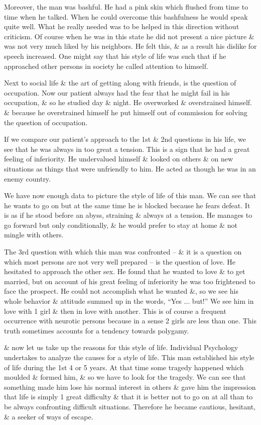 \documentclass{article}
\numberwithin{equation}{section}
\begin{document}
Moreover, the man was bashful. He had a pink skin which flushed from time to time when he talked. When he could overcome this bashfulness he would speak quite well. What he really needed was to be helped in this direction without criticism. Of course when he was in this state he did not present a nice picture \& was not very much liked by his neighbors. He felt this, \& as a result his dislike for speech increased. One might say that his style of life was such that if he approached other persons in society he called attention to himself.

Next to social life \& the art of getting along with friends, is the question of occupation. Now our patient always had the fear that he might fail in his occupation, \& so he studied day \& night. He overworked \& overstrained himself. \& because he overstrained himself he put himself out of commission for solving the question of occupation.

If we compare our patient's approach to the 1st \& 2nd questions in his life, we see that he was always in too great a tension. This is a sign that he had a great feeling of inferiority. He undervalued himself \& looked on others \& on new situations as things that were unfriendly to him. He acted as though he was in an enemy country.

We have now enough data to picture the style of life of this man. We can see that he wants to go on but at the same time he is blocked because he fears defeat. It is as if he stood before an abyss, straining \& always at a tension. He manages to go forward but only conditionally, \& he would prefer to stay at home \& not mingle with others.

The 3rd question with which this man was confronted -- \& it is a question on which most persons are not very well prepared -- is the question of love. He hesitated to approach the other sex. He found that he wanted to love \& to get married, but on account of his great feeling of inferiority he was too frightened to face the prospect. He could not accomplish what he wanted \&, so we see his whole behavior \& attitude summed up in the words, ``Yes $\ldots$ but!'' We see him in love with 1 girl \& then in love with another. This is of course a frequent occurrence with neurotic persons because in a sense 2 girls are less than one. This truth sometimes accounts for a tendency towards polygamy.

\& now let us take up the reasons for this style of life. Individual Psychology undertakes to analyze the causes for a style of life. This man established his style of life during the 1st 4 or 5 years. At that time some tragedy happened which moulded \& formed him, \& so we have to look for the tragedy. We can see that something made him lose his normal interest in others \& gave him the impression that life is simply 1 great difficulty \& that it is better not to go on at all than to be always confronting difficult situations. Therefore he became cautious, hesitant, \& a seeker of ways of escape.
\end{document}
